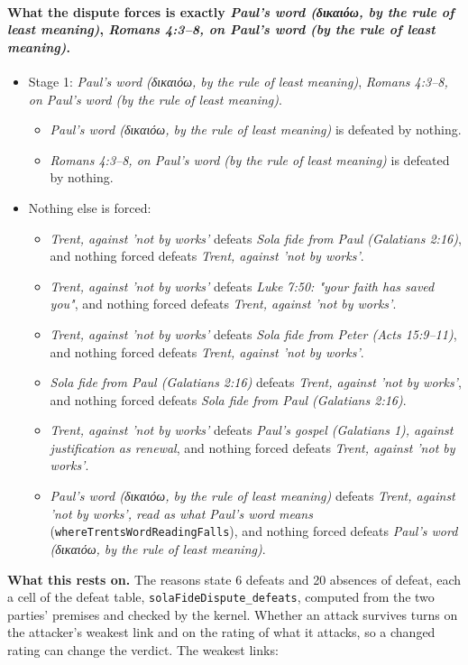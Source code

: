 \documentclass[11pt]{article}
\begin{document}
\paragraph{What the dispute forces is exactly \emph{Paul's word (δικαιόω, by the rule of least meaning)}, \emph{Romans 4:3–8, on Paul's word (by the rule of least meaning)}.}
\begin{itemize}
\item Stage 1: \emph{Paul's word (δικαιόω, by the rule of least meaning)}, \emph{Romans 4:3–8, on Paul's word (by the rule of least meaning)}.
\begin{itemize}
\item \emph{Paul's word (δικαιόω, by the rule of least meaning)} is defeated by nothing.
\item \emph{Romans 4:3–8, on Paul's word (by the rule of least meaning)} is defeated by nothing.
\end{itemize}
\item Nothing else is forced:
\begin{itemize}
\item \emph{Trent, against 'not by works'} defeats \emph{Sola fide from Paul (Galatians 2:16)}, and nothing forced defeats \emph{Trent, against 'not by works'}.
\item \emph{Trent, against 'not by works'} defeats \emph{Luke 7:50: "your faith has saved you"}, and nothing forced defeats \emph{Trent, against 'not by works'}.
\item \emph{Trent, against 'not by works'} defeats \emph{Sola fide from Peter (Acts 15:9–11)}, and nothing forced defeats \emph{Trent, against 'not by works'}.
\item \emph{Sola fide from Paul (Galatians 2:16)} defeats \emph{Trent, against 'not by works'}, and nothing forced defeats \emph{Sola fide from Paul (Galatians 2:16)}.
\item \emph{Trent, against 'not by works'} defeats \emph{Paul's gospel (Galatians 1), against justification as renewal}, and nothing forced defeats \emph{Trent, against 'not by works'}.
\item \emph{Paul's word (δικαιόω, by the rule of least meaning)} defeats \emph{Trent, against 'not by works', read as what Paul's word means} (\texttt{where\allowbreak{}Trents\allowbreak{}Word\allowbreak{}Reading\allowbreak{}Falls}), and nothing forced defeats \emph{Paul's word (δικαιόω, by the rule of least meaning)}.
\end{itemize}
\end{itemize}
\par\noindent\textbf{What this rests on.} The reasons state 6 defeats and 20 absences of defeat, each a cell of the defeat table, \texttt{sola\allowbreak{}Fide\allowbreak{}Dispute\_\allowbreak{}defeats}, computed from the two parties' premises and checked by the kernel. Whether an attack survives turns on the attacker's weakest link and on the rating of what it attacks, so a changed rating can change the verdict. The weakest links:
\end{document}
